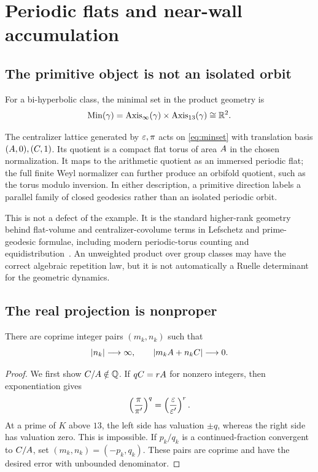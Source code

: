 \section{Periodic flats and near-wall accumulation}

\subsection{The primitive object is not an isolated orbit}

For a bi-hyperbolic class, the minimal set in the product geometry is
\begin{equation}\label{eq:minset}
\operatorname{Min}(\gamma)=\operatorname{Axis}_\infty(\gamma)\times\operatorname{Axis}_{13}(\gamma)
\cong\mathbb{R}^2.
\end{equation}

\begin{proposition}\label{prop:flat-torus}
The centralizer lattice generated by $\varepsilon,\pi$ acts on
\eqref{eq:minset} with translation basis $(A,0),(C,1)$.  Its quotient is
a compact flat torus of area $A$ in the chosen normalization.  It maps to
the arithmetic quotient as an immersed periodic flat; the full finite Weyl
normalizer can further produce an orbifold quotient, such as the torus
modulo inversion.  In either description, a primitive direction labels a
parallel family of closed geodesics rather than an isolated periodic orbit.
\end{proposition}

This is not a defect of the example.  It is the standard higher-rank
geometry behind flat-volume and centralizer-covolume terms in Lefschetz and
prime-geodesic formulae, including modern periodic-torus counting and
equidistribution~\cite{Deitmar2004,Deitmar2007,DangLi2022}.  An unweighted product
over group classes may have the correct algebraic repetition law, but it is
not automatically a Ruelle determinant for the geometric dynamics.

\subsection{The real projection is nonproper}

\begin{theorem}\label{thm:near-wall}
There are coprime integer pairs $(m_k,n_k)$ such that
\[
|n_k|\longrightarrow\infty,
\qquad
|m_kA+n_kC|\longrightarrow0.
\]
\end{theorem}

\begin{proof}
We first show $C/A\notin\mathbb{Q}$.  If $qC=rA$ for nonzero integers, then
exponentiation gives
\[
\left(\frac{\pi}{\pi'}\right)^q
=\left(\frac{\varepsilon}{\varepsilon'}\right)^r.
\]
At a prime of $K$ above $13$, the left side has valuation $\pm q$, whereas
the right side has valuation zero.  This is impossible.  If $p_k/q_k$ is a
continued-fraction convergent to $C/A$, set
$(m_k,n_k)=(-p_k,q_k)$.  These pairs are coprime and have the desired error
with unbounded denominator.
\end{proof}

